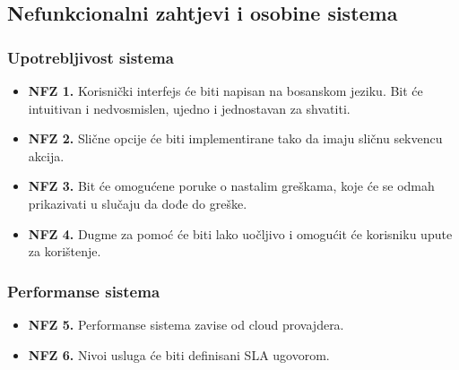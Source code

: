 \subsection{Nefunkcionalni zahtjevi i osobine sistema}
\subsubsection{Upotrebljivost sistema}
\begin{itemize}
    \item \textbf{NFZ 1.} Korisnički interfejs će biti napisan na bosanskom jeziku. Bit će intuitivan i nedvosmislen, ujedno i jednostavan za shvatiti.
    \item \textbf{NFZ 2.} Slične opcije će biti implementirane tako da imaju sličnu sekvencu akcija.
    \item \textbf{NFZ 3.} Bit će omogućene poruke o nastalim greškama, koje će se odmah prikazivati u slučaju da dođe do greške.
    \item \textbf{NFZ 4.} Dugme za pomoć će biti lako uočljivo i omogućit će korisniku upute za korištenje.
\end{itemize}

\subsubsection{Performanse sistema}
\begin{itemize}
    \item \textbf{NFZ 5.} Performanse sistema zavise od cloud provajdera.
    \item \textbf{NFZ 6.} Nivoi usluga će biti definisani SLA ugovorom.
\end{itemize}
